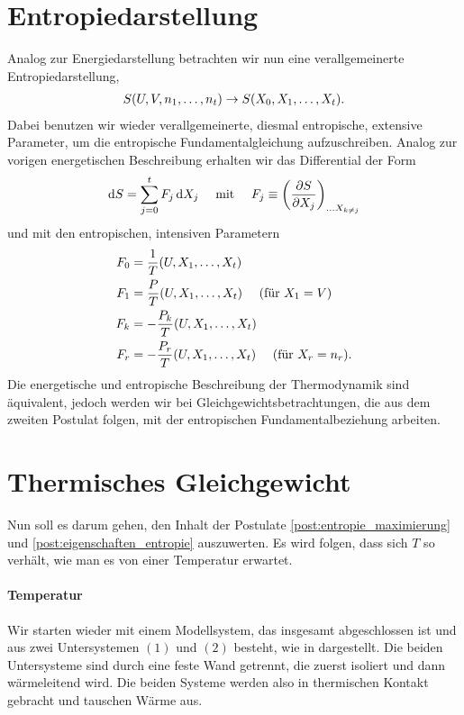 \section{Entropiedarstellung}
Analog zur Energiedarstellung betrachten wir nun eine verallgemeinerte Entropiedarstellung,
\begin{align*}
    S(U,V,n_1,\ldots,n_t) \rightarrow S(X_0,X_1,\ldots,X_t).
\end{align*}
Dabei benutzen wir wieder verallgemeinerte, diesmal entropische, extensive Parameter, um die entropische Fundamentalgleichung aufzuschreiben. Analog zur vorigen energetischen Beschreibung erhalten wir das Differential der Form
\begin{align*}
    \mathop{}\!\mathrm{d} S = \sum_{j=0}^tF_j\mathop{}\!\mathrm{d} X_j \quad\text{ mit } \quad F_j\equiv\left( \frac{\partial S}{\partial X_j} \right)_{\ldots X_{k\neq j}}
\end{align*}
und mit den entropischen, intensiven Parametern
\begin{align*}
    F_0 & =\frac{1}{T}(U,X_1,\ldots,X_t)                                      \\
    F_1 & =\frac{P}{T}(U,X_1,\ldots,X_t) \quad\text{ (für $X_1=V$)}           \\
    F_k & =-\frac{P_k}{T}(U,X_1,\ldots,X_t)                                   \\
    F_r & =-\frac{P_r}{T}(U,X_1,\ldots,X_t) \quad\text{ (für $X_r=n_r$)}.
\end{align*}
Die energetische und entropische Beschreibung der Thermodynamik sind äquivalent, jedoch werden wir bei Gleichgewichtsbetrachtungen, die aus dem zweiten Postulat folgen, mit der entropischen Fundamentalbeziehung arbeiten.

\section{Thermisches Gleichgewicht\label{sec:thermisches_gleichgewicht}}

Nun soll es darum gehen, den Inhalt der Postulate \ref{post:entropie_maximierung} und \ref{post:eigenschaften_entropie} auszuwerten.
Es wird folgen, dass sich $T$ so verhält, wie man es von einer Temperatur erwartet.

\paragraph*{Temperatur}

Wir starten wieder mit einem Modellsystem, das insgesamt abgeschlossen ist und aus zwei Untersystemen $(1)$ und $(2)$ besteht, wie in  dargestellt.
Die beiden Untersysteme sind durch eine feste Wand getrennt, die zuerst isoliert und dann wärmeleitend wird. Die beiden Systeme werden also in thermischen Kontakt gebracht und tauschen Wärme aus.

